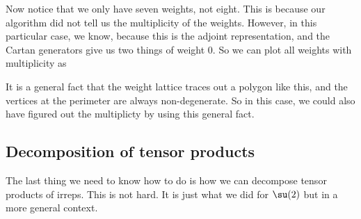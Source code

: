 \documentclass[a4paper]{article}
\begin{document}
\begin{eg}
\begin{center}
  \end{center}
  Now notice that we only have seven weights, not eight. This is because our algorithm did not tell us the multiplicity of the weights. However, in this particular case, we know, because this is the adjoint representation, and the Cartan generators give us two things of weight $0$. So we can plot all weights with multiplicity as
  \begin{center}
  \end{center}
\end{eg}

It is a general fact that the weight lattice traces out a polygon like this, and the vertices at the perimeter are always non-degenerate. So in this case, we could also have figured out the multiplicty by using this general fact.

\subsection{Decomposition of tensor products}
The last thing we need to know how to do is how we can decompose tensor products of irreps. This is not hard. It is just what we did for $\su(2)$ but in a more general context.
\end{document}
